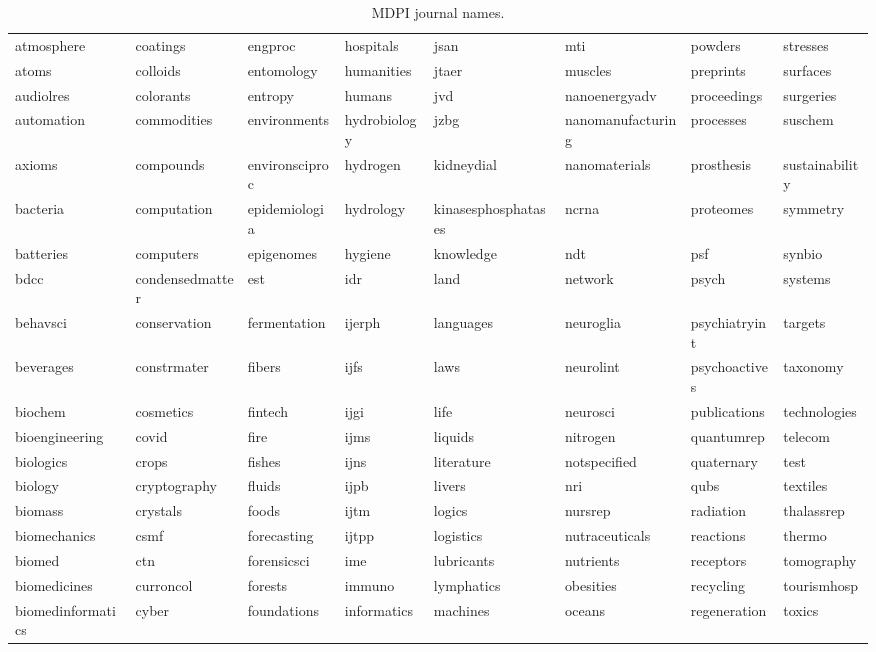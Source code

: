 \documentclass[atmosphere,article,submit,moreauthors,pdftex]{Definitions/mdpi}
\begin{document}
\startlandscape

\begin{longtable}[t]{llllllll}
\caption{\label{tab:mdpinames}MDPI journal names.}\\
\toprule
atmosphere & coatings & engproc & hospitals & jsan & mti & powders & stresses\\
atoms & colloids & entomology & humanities & jtaer & muscles & preprints & surfaces\\
audiolres & colorants & entropy & humans & jvd & nanoenergyadv & proceedings & surgeries\\
automation & commodities & environments & hydrobiology & jzbg & nanomanufacturing & processes & suschem\\
axioms & compounds & environsciproc & hydrogen & kidneydial & nanomaterials & prosthesis & sustainability\\
\addlinespace
bacteria & computation & epidemiologia & hydrology & kinasesphosphatases & ncrna & proteomes & symmetry\\
batteries & computers & epigenomes & hygiene & knowledge & ndt & psf & synbio\\
bdcc & condensedmatter & est & idr & land & network & psych & systems\\
behavsci & conservation & fermentation & ijerph & languages & neuroglia & psychiatryint & targets\\
beverages & constrmater & fibers & ijfs & laws & neurolint & psychoactives & taxonomy\\
\addlinespace
biochem & cosmetics & fintech & ijgi & life & neurosci & publications & technologies\\
bioengineering & covid & fire & ijms & liquids & nitrogen & quantumrep & telecom\\
biologics & crops & fishes & ijns & literature & notspecified & quaternary & test\\
biology & cryptography & fluids & ijpb & livers & nri & qubs & textiles\\
biomass & crystals & foods & ijtm & logics & nursrep & radiation & thalassrep\\
\addlinespace
biomechanics & csmf & forecasting & ijtpp & logistics & nutraceuticals & reactions & thermo\\
biomed & ctn & forensicsci & ime & lubricants & nutrients & receptors & tomography\\
biomedicines & curroncol & forests & immuno & lymphatics & obesities & recycling & tourismhosp\\
biomedinformatics & cyber & foundations & informatics & machines & oceans & regeneration & toxics\\

\end{longtable}
\end{document}
